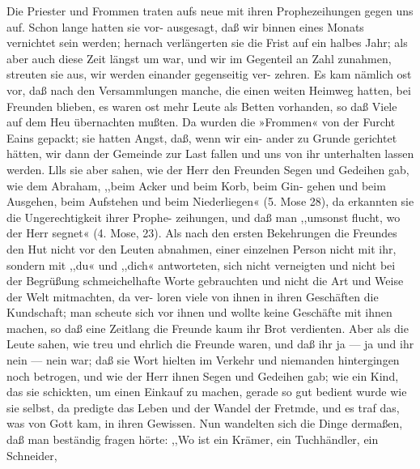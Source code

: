 Die Priester und Frommen traten aufs neue mit ihren
Prophezeihungen gegen uns auf. Schon lange hatten sie vor-
ausgesagt, daß wir binnen eines Monats vernichtet sein werden;
hernach verlängerten sie die Frist auf ein halbes Jahr; als aber
auch diese Zeit längst um war, und wir im Gegenteil an Zahl
zunahmen, streuten sie aus, wir werden einander gegenseitig ver-
zehren. Es kam nämlich ost vor, daß nach den Versammlungen
manche, die einen weiten Heimweg hatten, bei Freunden blieben,
es waren ost mehr Leute als Betten vorhanden, so daß Viele auf
dem Heu übernachten mußten. Da wurden die »Frommen« von
der Furcht Eains gepackt; sie hatten Angst, daß, wenn wir ein-
ander zu Grunde gerichtet hätten, wir dann der Gemeinde zur
Last fallen und uns von ihr unterhalten lassen werden. Llls sie
aber sahen, wie der Herr den Freunden Segen und Gedeihen
gab, wie dem Abraham, ,,beim Acker und beim Korb, beim Gin-
gehen und beim Ausgehen, beim Aufstehen und beim Niederliegen«
(5. Mose 28), da erkannten sie die Ungerechtigkeit ihrer Prophe-
zeihungen, und daß man ,,umsonst flucht, wo der Herr segnet«
(4. Mose, 23). Als nach den ersten Bekehrungen die Freundes
den Hut nicht vor den Leuten abnahmen, einer einzelnen Person
nicht mit ihr, sondern mit ,,du« und ,,dich« antworteten, sich nicht
verneigten und nicht bei der Begrüßung schmeichelhafte Worte
gebrauchten und nicht die Art und Weise der Welt mitmachten, da ver-
loren viele von ihnen in ihren Geschäften die Kundschaft; man
scheute sich vor ihnen und wollte keine Geschäfte mit ihnen machen,
so daß eine Zeitlang die Freunde kaum ihr Brot verdienten. Aber
als die Leute sahen, wie treu und ehrlich die Freunde waren,
und daß ihr ja — ja und ihr nein — nein war; daß sie Wort hielten
im Verkehr und niemanden hintergingen noch betrogen, und wie
der Herr ihnen Segen und Gedeihen gab; wie ein Kind, das sie
schickten, um einen Einkauf zu machen, gerade so gut bedient
wurde wie sie selbst, da predigte das Leben und der Wandel der
Fretmde, und es traf das, was von Gott kam, in ihren Gewissen.
Nun wandelten sich die Dinge dermaßen, daß man beständig
fragen hörte: ,,Wo ist ein Krämer, ein Tuchhändler, ein Schneider,
 


